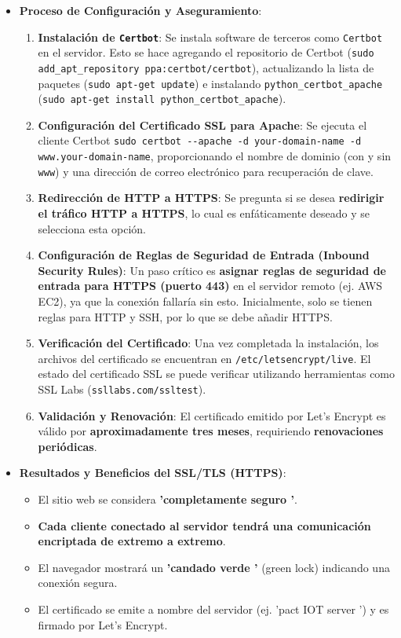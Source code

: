 \documentclass{report}
\begin{document}
\begin{itemize}
    \item \textbf{Proceso de Configuración y Aseguramiento}:
    \begin{enumerate}
        \item \textbf{Instalación de \texttt{Certbot}}: Se instala software de terceros como \texttt{Certbot} en el servidor. Esto se hace agregando 
        el repositorio de Certbot (\verb|sudo add_apt_repository ppa:certbot/certbot|), actualizando la lista de paquetes (\verb|sudo apt-get update|) 
        e instalando \verb|python_certbot_apache| (\verb|sudo apt-get install python_certbot_apache|).
        \item \textbf{Configuración del Certificado SSL para Apache}: Se ejecuta el cliente Certbot 
        \verb|sudo certbot --apache -d your-domain-name -d www.your-domain-name|, proporcionando el nombre de dominio (con y sin \texttt{www}) y una dirección 
        de correo electrónico para recuperación de clave.
        \item \textbf{Redirección de HTTP a HTTPS}: Se pregunta si se desea \textbf{redirigir el tráfico HTTP a HTTPS}, lo cual es enfáticamente 
        deseado y se selecciona esta opción.
        \item \textbf{Configuración de Reglas de Seguridad de Entrada (Inbound Security Rules)}: Un paso crítico es \textbf{asignar reglas de seguridad 
        de entrada para HTTPS (puerto 443)} en el servidor remoto (ej. AWS EC2), ya que la conexión fallaría sin esto. Inicialmente, solo se tienen 
        reglas para HTTP y SSH, por lo que se debe añadir HTTPS.
        \item \textbf{Verificación del Certificado}: Una vez completada la instalación, los archivos del certificado se encuentran en 
        \verb|/etc/letsencrypt/live|. El estado del certificado SSL se puede verificar utilizando herramientas como SSL Labs (\verb|ssllabs.com/ssltest|).
        \item \textbf{Validación y Renovación}: El certificado emitido por Let's Encrypt es válido por \textbf{aproximadamente tres meses}, 
        requiriendo \textbf{renovaciones periódicas}.
    \end{enumerate}

    \item \textbf{Resultados y Beneficios del SSL/TLS (HTTPS)}:
    \begin{itemize}
        \item El sitio web se considera \textbf{ 'completamente seguro '}.
        \item \textbf{Cada cliente conectado al servidor tendrá una comunicación encriptada de extremo a extremo}.
        \item El navegador mostrará un \textbf{ 'candado verde '} (green lock) indicando una conexión segura.
        \item El certificado se emite a nombre del servidor (ej.  'pact IOT server ') y es firmado por Let's Encrypt.
    \end{itemize}
\end{itemize}
\end{document}
